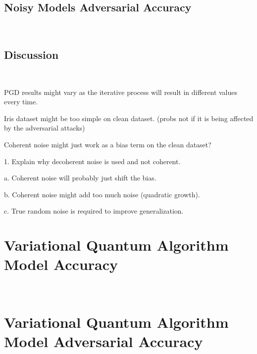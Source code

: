 \subsection{Noisy Models Adversarial Accuracy}\label{subsection:plus-minus-noisy-adv-acc} \

\subsection{Discussion}\label{subsection:discussion} \

PGD results might vary as the iterative process will result in different
values every time. \

Iris dataset might be too simple on clean dataset. (probs not if it is being affected by the adversarial attacks)

Coherent noise might just work as a bias term on the clean dataset? \


1.	Explain why decoherent noise is used and not coherent. \

  a. Coherent noise will probably just shift the bias. \

  b. Coherent noise might add too much noise (quadratic growth). \

  c. True random noise is required to improve generalization. \


\section{Variational Quantum Algorithm Model Accuracy}\label{section:vqa_accuracy} \


\section{Variational Quantum Algorithm Model Adversarial Accuracy}\label{section:vqa_adversarial_accuracy} \

